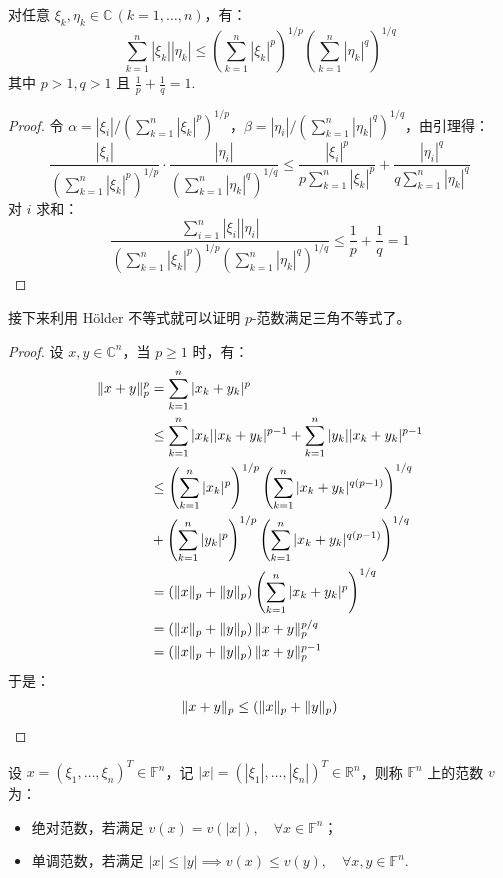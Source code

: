 \begin{theorem}
对任意 $\xi_k,\eta_k\in\mathbb C\,(k=1,\ldots,n)$，有：
\[
    \sum_{k=1}^n|\xi_k||\eta_k|\leq\left(\sum_{k=1}^n|\xi_k|^p\right)^{1/p}\left(\sum_{k=1}^n|\eta_k|^q\right)^{1/q}
\]
其中 $p>1,q>1$ 且 $\frac{1}{p}+\frac{1}{q}=1$.
\end{theorem}
\begin{proof}
令 $\alpha={|\xi_i|}/{\left(\sum_{k=1}^n|\xi_k|^p\right)^{1/p}}$，$\beta={|\eta_i|}/{\left(\sum_{k=1}^n|\eta_k|^q\right)^{1/q}}$，由引理得：
\[
    \frac{|\xi_i|}{\left(\sum_{k=1}^n|\xi_k|^p\right)^{1/p}}\cdot\frac{|\eta_i|}{\left(\sum_{k=1}^n|\eta_k|^q\right)^{1/q}}\leq\frac{|\xi_i|^p}{p\sum_{k=1}^n|\xi_k|^p}+\frac{|\eta_i|^q}{q\sum_{k=1}^n|\eta_k|^q}
\]
对 $i$ 求和：
\[
    \frac{\sum_{i=1}^n|\xi_i||\eta_i|}{\left(\sum_{k=1}^n|\xi_k|^p\right)^{1/p}\left(\sum_{k=1}^n|\eta_k|^q\right)^{1/q}}\leq\frac{1}{p}+\frac{1}{q}=1
\]
\end{proof}

接下来利用 Hölder 不等式就可以证明 $p$-范数满足三角不等式了。

\begin{proof}
设 $x,y\in\mathbb C^n$，当 $p\geq 1$ 时，有：
\begin{align*}
    \Vert x+y\Vert_p^p&=\sum_{k=1}^n|x_k+y_k|^p\\
    &\leq\sum_{k=1}^n|x_k||x_k+y_k|^{p-1}+\sum_{k=1}^n|y_k||x_k+y_k|^{p-1}\\
    &\leq\left(\sum_{k=1}^n|x_k|^p\right)^{1/p}\left(\sum_{k=1}^n|x_k+y_k|^{q(p-1)}\right)^{1/q}\\&+\left(\sum_{k=1}^n|y_k|^p\right)^{1/p}\left(\sum_{k=1}^n|x_k+y_k|^{q(p-1)}\right)^{1/q}\\
    &=\left(\Vert x\Vert_p+\Vert y\Vert_p\right)\left(\sum_{k=1}^n|x_k+y_k|^{p}\right)^{1/q}\\
    &=\left(\Vert x\Vert_p+\Vert y\Vert_p\right)\Vert x+y\Vert_p^{p/q}\\
    &=\left(\Vert x\Vert_p+\Vert y\Vert_p\right)\Vert x+y\Vert_p^{p-1}
\end{align*}
于是：
\[
    \Vert x+y\Vert_p\leq\left(\Vert x\Vert_p+\Vert y\Vert_p\right)
\]
\end{proof}

\begin{definition}
设 $x=(\xi_1,\ldots,\xi_n)^T\in\mathbb F^n$，记 $|x|=(|\xi_1|,\ldots,|\xi_n|)^T\in\mathbb R^n$，则称 $\mathbb F^n$ 上的范数 $v$ 为：
\begin{itemize}
    \item 绝对范数，若满足 $v(x)=v(|x|),\quad \forall x\in\mathbb F^n$；
    \item 单调范数，若满足 $|x|\leq |y|\implies v(x)\leq v(y),\quad \forall x,y\in\mathbb F^n$.
\end{itemize}
\end{definition}

